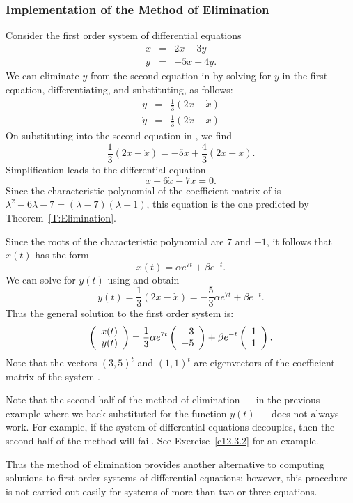 \subsubsection*{Implementation of the Method of Elimination}

Consider the first order system of differential equations
\begin{equation}  \label{E:Elim1}
\begin{array}{rcl}
\dot{x} & = & 2x-3y\\
\dot{y} & = & -5x+4y. 
\end{array}
\end{equation}
We can eliminate $y$ from the second equation in  by solving for 
$y$ in the first equation, differentiating, and substituting, as follows:
\begin{equation} \label{E:Elim1a}
\begin{array}{rcl}
y & = & \frac{1}{3}(2x-\dot{x})\\
\dot{y} & = & \frac{1}{3}(2\dot{x}-\ddot{x})
\end{array}
\end{equation}
On substituting  into the second equation in , we
find
\[
\frac{1}{3}(2\dot{x}-\ddot{x}) = -5x + \frac{4}{3}(2x-\dot{x}).
\]
Simplification leads to the differential equation
\[
\ddot{x} - 6\dot{x} - 7x = 0.
\]
Since the characteristic polynomial of the coefficient matrix of 
is $\lambda^2-6\lambda-7=(\lambda-7)(\lambda+1)$, this equation is the one 
predicted by Theorem~\ref{T:Elimination}.

Since the roots of the characteristic polynomial are $7$ and $-1$, it follows 
that $x(t)$ has the form
\[
x(t)  =  \alpha e^{7t} + \beta e^{-t}.
\]
We can solve for $y(t)$ using  and obtain
\[
y(t) = \frac{1}{3}(2x-\dot{x}) = -\frac{5}{3} \alpha e^{7t} + \beta e^{-t}.
\]
Thus the general solution to the first order system is:
\[
\left(\begin{array}{r} x(t) \\ y(t)\end{array}\right) = \frac{1}{3}\alpha e^{7t}\left(\begin{array}{r} 3 \\ -5\end{array}\right) + 
\beta e^{-t}\left(\begin{array}{r} 1 \\ 1\end{array}\right).
\]
Note that the vectors $(3,5)^t$ and $(1,1)^t$ are eigenvectors of the coefficient matrix of the system .

Note that the second half of the method of elimination --- in the previous 
example where we back substituted for the function $y(t)$ --- does not always 
work.  For example, if the system of differential equations decouples, then 
the second half of the method will fail.   See Exercise~\ref{c12.3.2} for an 
example. 

Thus the method of elimination provides another alternative to computing 
solutions to first order systems of differential equations; however, this 
procedure is not carried out easily for systems of more than two or three 
equations.


